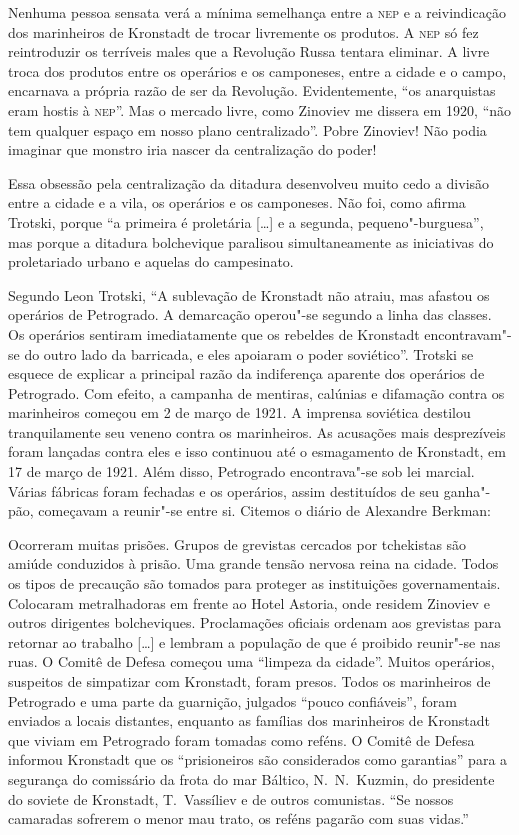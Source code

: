 Nenhuma pessoa sensata verá a mínima semelhança entre a \textsc{nep} e a
reivindicação dos marinheiros de Kronstadt de trocar livremente os
produtos. A \textsc{nep} só fez reintroduzir os terríveis males que a
Revolução Russa tentara eliminar. A livre troca dos produtos entre os
operários e os camponeses, entre a cidade e o campo, encarnava a
própria razão de ser da Revolução. Evidentemente, “os anarquistas eram
hostis à \textsc{nep}”. Mas o mercado livre, como Zinoviev me dissera em
1920, “não tem qualquer espaço em nosso plano centralizado”. Pobre
Zinoviev! Não podia imaginar que monstro iria nascer da centralização
do poder!

Essa obsessão pela centralização da ditadura desenvolveu muito cedo
a divisão entre a cidade e a vila, os operários e os camponeses. Não
foi, como afirma Trotski, porque “a primeira é proletária [\ldots] e a
segunda, pequeno"-burguesa”, mas porque a ditadura bolchevique
paralisou simultaneamente as iniciativas do proletariado urbano e
aquelas do campesinato.

Segundo Leon Trotski, “A sublevação de Kronstadt não atraiu, mas afastou
os operários de Petrogrado. A demarcação operou"-se segundo a linha
das classes. Os operários sentiram imediatamente que os rebeldes de
Kronstadt encontravam"-se do outro lado da barricada, e eles apoiaram
o poder soviético”. Trotski se esquece de explicar a principal razão da
indiferença aparente dos operários de Petrogrado. Com efeito, a
campanha de mentiras, calúnias e difamação contra os marinheiros
começou em 2 de março de 1921. A imprensa soviética destilou
tranquilamente seu veneno contra os marinheiros. As acusações mais
desprezíveis foram lançadas contra eles e isso continuou até o
esmagamento de Kronstadt, em 17 de março de 1921. Além disso,
Petrogrado encontrava"-se sob lei marcial. Várias fábricas foram
fechadas e os operários, assim destituídos de seu ganha"-pão, começavam
a reunir"-se entre si. Citemos o diário de Alexandre Berkman:

\begin{hedraquote}
Ocorreram muitas prisões. Grupos de grevistas cercados por tchekistas
são amiúde conduzidos à prisão. Uma grande tensão nervosa reina na
cidade. Todos os tipos de precaução são tomados para proteger as
instituições governamentais. Colocaram metralhadoras em frente ao Hotel
Astoria, onde residem Zinoviev e outros dirigentes bolcheviques.
Proclamações oficiais ordenam aos grevistas para retornar ao trabalho
[\ldots] e lembram a população de que é proibido reunir"-se nas ruas. O
Comitê de Defesa começou uma “limpeza da cidade”. Muitos operários,
suspeitos de simpatizar com Kronstadt, foram presos. Todos os
marinheiros de Petrogrado e uma parte da guarnição, julgados “pouco
confiáveis”, foram enviados a locais distantes, enquanto as famílias dos
marinheiros de Kronstadt que viviam em Petrogrado foram tomadas como
reféns. O Comitê de Defesa informou Kronstadt que os “prisioneiros são
considerados como garantias” para a segurança do comissário da frota do
mar Báltico, N.~N.~Kuzmin, do presidente do soviete de Kronstadt, 
T.~Vassíliev e de outros comunistas. “Se nossos camaradas sofrerem o menor
mau trato, os reféns pagarão com suas vidas.”
\end{hedraquote}


